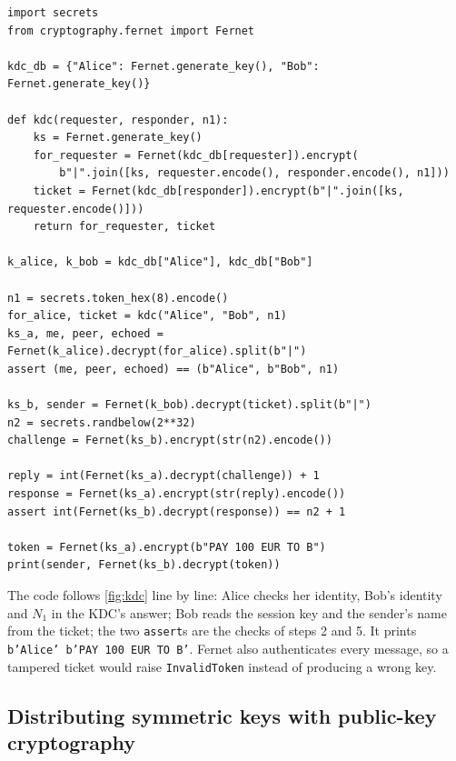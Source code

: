\begin{verbatim}
import secrets
from cryptography.fernet import Fernet

kdc_db = {"Alice": Fernet.generate_key(), "Bob": Fernet.generate_key()}

def kdc(requester, responder, n1):
    ks = Fernet.generate_key()
    for_requester = Fernet(kdc_db[requester]).encrypt(
        b"|".join([ks, requester.encode(), responder.encode(), n1]))
    ticket = Fernet(kdc_db[responder]).encrypt(b"|".join([ks, requester.encode()]))
    return for_requester, ticket

k_alice, k_bob = kdc_db["Alice"], kdc_db["Bob"]

n1 = secrets.token_hex(8).encode()
for_alice, ticket = kdc("Alice", "Bob", n1)
ks_a, me, peer, echoed = Fernet(k_alice).decrypt(for_alice).split(b"|")
assert (me, peer, echoed) == (b"Alice", b"Bob", n1)

ks_b, sender = Fernet(k_bob).decrypt(ticket).split(b"|")
n2 = secrets.randbelow(2**32)
challenge = Fernet(ks_b).encrypt(str(n2).encode())

reply = int(Fernet(ks_a).decrypt(challenge)) + 1
response = Fernet(ks_a).encrypt(str(reply).encode())
assert int(Fernet(ks_b).decrypt(response)) == n2 + 1

token = Fernet(ks_a).encrypt(b"PAY 100 EUR TO B")
print(sender, Fernet(ks_b).decrypt(token))
\end{verbatim}

The code follows \cref{fig:kdc} line by line: Alice checks her identity, Bob's identity and $N_1$ in the KDC's answer; Bob reads the session key and the sender's name from the ticket; the two \texttt{assert}s are the checks of steps 2 and 5. It prints \texttt{b'Alice' b'PAY 100 EUR TO B'}. Fernet also authenticates every message, so a tampered ticket would raise \texttt{InvalidToken} instead of producing a wrong key.

\subsection{Distributing symmetric keys with public-key cryptography}


